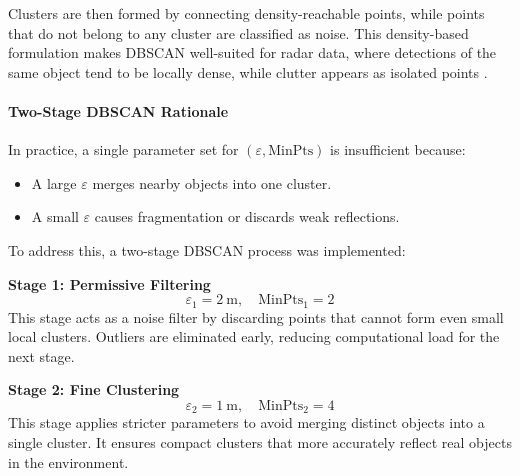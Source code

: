 \vspace{2\baselineskip}

Clusters are then formed by connecting density-reachable points, while points that do not belong to any cluster are classified as noise.  
This density-based formulation makes DBSCAN well-suited for radar data, where detections of the same object tend to be locally dense, while clutter appears as isolated points \cite{Radar_Object_Detection_From_Point_Clouds}.

\paragraph{Two-Stage DBSCAN Rationale}
In practice, a single parameter set for $(\varepsilon, \text{MinPts})$ is insufficient because:
\begin{itemize}
    \item A large $\varepsilon$ merges nearby objects into one cluster.
    \item A small $\varepsilon$ causes fragmentation or discards weak reflections.
\end{itemize}

To address this, a two-stage DBSCAN process was implemented:

\textbf{Stage 1: Permissive Filtering}
\begin{equation}
    \varepsilon_1 = \SI{2}{\meter}, \quad \text{MinPts}_1 = 2
\end{equation}
This stage acts as a noise filter by discarding points that cannot form even small local clusters.  
Outliers are eliminated early, reducing computational load for the next stage.

\textbf{Stage 2: Fine Clustering}
\begin{equation}
    \varepsilon_2 = \SI{1}{\meter}, \quad \text{MinPts}_2 = 4
\end{equation}
This stage applies stricter parameters to avoid merging distinct objects into a single cluster.  
It ensures compact clusters that more accurately reflect real objects in the environment.

